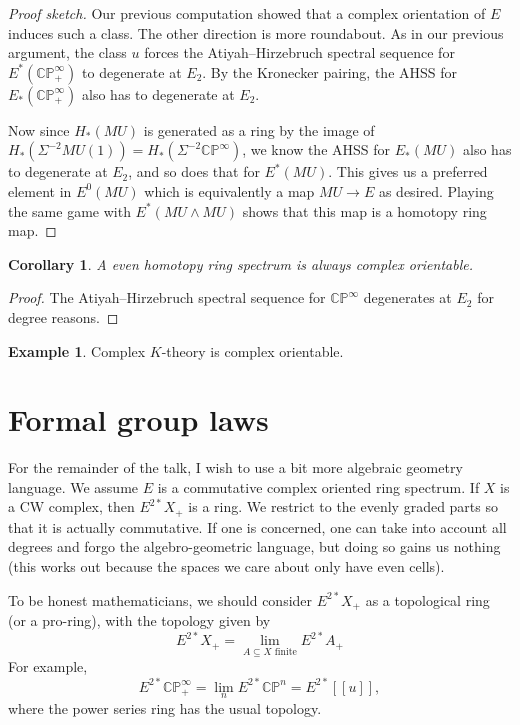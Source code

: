 \documentclass{shortart}
\newtheorem{cor}[thm]{Corollary}
\theoremstyle{definition}
\newtheorem{eg}[thm]{Example}
\newcommand\CP{\mathbb{CP}}
\begin{document}
\begin{proof}[Proof sketch]
  Our previous computation showed that a complex orientation of $E$ induces such a class. The other direction is more roundabout. As in our previous argument, the class $u$ forces the Atiyah--Hirzebruch spectral sequence for $E^*(\CP^\infty_+)$ to degenerate at $E_2$. By the Kronecker pairing, the AHSS for $E_*(\CP^\infty_+)$ also has to degenerate at $E_2$.

  Now since $H_*(MU)$ is generated as a ring by the image of $H_*(\Sigma^{-2} MU(1)) = H_*(\Sigma^{-2}\CP^\infty)$, we know the AHSS for $E_*(MU)$ also has to degenerate at $E_2$, and so does that for $E^*(MU)$. This gives us a preferred element in $E^0(MU)$ which is equivalently a map $MU \to E$ as desired. Playing the same game with $E^*(MU \wedge MU)$ shows that this map is a homotopy ring map.
\end{proof}

\begin{cor}
  A even homotopy ring spectrum is always complex orientable.
\end{cor}

\begin{proof}
  The Atiyah--Hirzebruch spectral sequence for $\CP^\infty$ degenerates at $E_2$ for degree reasons.
\end{proof}

\begin{eg}
  Complex $K$-theory is complex orientable.
\end{eg}

\section{Formal group laws}
For the remainder of the talk, I wish to use a bit more algebraic geometry language. We assume $E$ is a commutative complex oriented ring spectrum. If $X$ is a CW complex, then $E^{2*}X_+$ is a ring. We restrict to the evenly graded parts so that it is actually commutative. If one is concerned, one can take into account all degrees and forgo the algebro-geometric language, but doing so gains us nothing (this works out because the spaces we care about only have even cells).

To be honest mathematicians, we should consider $E^{2*} X_+$ as a topological ring (or a pro-ring), with the topology given by
\[
  E^{2*} X_+ = \lim_{A \subseteq X \text{ finite}} E^{2*} A_+
\]
For example, 
\[
  E^{2*} \CP^\infty_+ = \lim_n E^{2*} \CP^n = E^{2*}[\![u]\!],
\]
where the power series ring has the usual topology.
\end{document}
